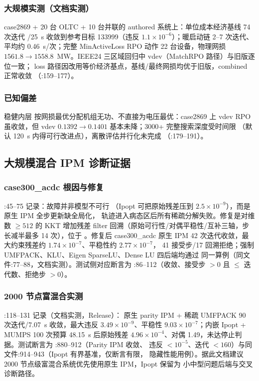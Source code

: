 \subsubsection*{大规模实测（文档实测）}
case2869 + 20 台 OLTC + 10 台并联的 authored 系统上：单位成本经济基线 74 次迭代
/25~s 收敛到参考目标 133999（违反 $1.1\times10^{-6}$）；暖启动链 2--7 次迭代、
平均约 0.46~s/次；完整 MinActiveLoss RPO 动作 22 台设备，物理网损
$1561.8\to1558.8$~MW。IEEE24 三区域回归中 vdev（MatchRPO 路径）与旧版逐位一致；
loss 路径因改用等价经济基点，基线/最终网损均优于旧版，combined 正常收敛
（:159--177）。

\subsubsection*{已知偏差}
稳健内层  按网损最优分配机组无功、不直接为电压最优：case2869 上
vdev RPO 虽收敛，但 vdev $0.1392\to0.1401$ 基本未降；3000+ 完整搜索深度受时间限
（默认 120~s 内得可行改进点），离散评估并行化未完成
（:179--191）。

\subsection{大规模混合 IPM 诊断证据}\label{subsec:ver:ipm}

\subsubsection*{case300\_acdc 根因与修复}
:45--75 记录：故障并非模型不可行
（Ipopt 可把原始残差压到 $2.5\times10^{-9}$），而是原生 IPM 全步更新缺全局化，
轨迹进入病态区后所有稀疏分解失败。修复是对维数 $\ge512$ 的 KKT 增加残差 filter
回溯（原始可行性/对偶平稳性/互补三轴，步长减半最多 14 次），位于
。修复后 case300\_acdc 原生 IPM
42 次迭代收敛，最大约束残差约 $1.74\times10^{-7}$、平稳性约 $2.77\times10^{-7}$，
41 接受步/17 回溯拒绝；强制 UMFPACK、KLU、Eigen SparseLU、Dense LU 四后端均通过
同一算例（同文件:77--88，文档实测）。测试侧对应断言为
:86--112（收敛、接受步 $>0$ 且
$\le$ 迭代数、拒绝步 $>0$）。

\subsubsection*{2000 节点富混合实测}
:118--131 记录（文档实测，Release）：
原生 parity IPM + 稀疏 UMFPACK 90 次迭代/7.07~s 收敛，最大违反
$3.49\times10^{-9}$、平稳性 $9.03\times10^{-7}$；内嵌 Ipopt + MUMPS 100 次预算
48.15~s 后原始残差 $4.96\times10^{-4}$、对偶 1.49，未达停止判据。测试断言为
:880--912（Parity IPM 收敛、
违反 $<10^{-5}$、迭代 $<160$）与同文件:914--943（Ipopt 有界基准，仅断言有限，
隐藏性能用例）。据此文档建议 2000 节点级富混合系统优先使用原生 IPM，Ipopt 保留为
小中型问题后端与交叉诊断路径。

